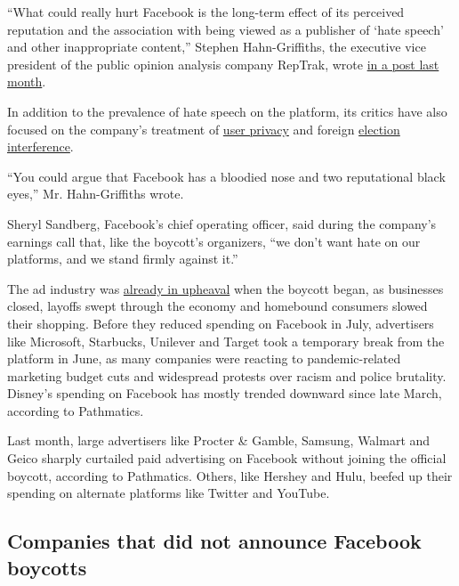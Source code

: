 ``What could really hurt Facebook is the long-term effect of its
perceived reputation and the association with being viewed as a
publisher of `hate speech' and other inappropriate content,'' Stephen
Hahn-Griffiths, the executive vice president of the public opinion
analysis company RepTrak, wrote
\href{https://www.reptrak.com/blog/what-companies-can-learn-from-facebooks-latest-reputation-challenge/}{in
a post last month}.

In addition to the prevalence of hate speech on the platform, its
critics have also focused on the company's treatment of
\href{https://www.nytimes3xbfgragh.onion/2018/12/18/technology/facebook-privacy.html}{user
privacy} and foreign
\href{https://www.nytimes3xbfgragh.onion/2017/11/01/us/politics/russia-2016-election-facebook.html}{election
interference}.

``You could argue that Facebook has a bloodied nose and two reputational
black eyes,'' Mr. Hahn-Griffiths wrote.

Sheryl Sandberg, Facebook's chief operating officer, said during the
company's earnings call that, like the boycott's organizers, ``we don't
want hate on our platforms, and we stand firmly against it.''

The ad industry was
\href{https://www.nytimes3xbfgragh.onion/2020/07/28/business/media/coronavirus-pandemic-advertising-industry.html}{already
in upheaval} when the boycott began, as businesses closed, layoffs swept
through the economy and homebound consumers slowed their shopping.
Before they reduced spending on Facebook in July, advertisers like
Microsoft, Starbucks, Unilever and Target took a temporary break from
the platform in June, as many companies were reacting to
pandemic-related marketing budget cuts and widespread protests over
racism and police brutality. Disney's spending on Facebook has mostly
trended downward since late March, according to Pathmatics.

Last month, large advertisers like Procter \& Gamble, Samsung, Walmart
and Geico sharply curtailed paid advertising on Facebook without joining
the official boycott, according to Pathmatics. Others, like Hershey and
Hulu, beefed up their spending on alternate platforms like Twitter and
YouTube.

\hypertarget{companies-that-did-not-announce-facebook-boycotts}{%
\subsection{Companies that did not announce Facebook
boycotts}\label{companies-that-did-not-announce-facebook-boycotts}}

